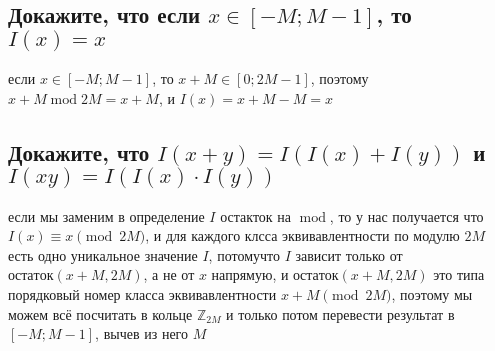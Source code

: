 \documentclass{article}
\newcommand{\Mod}[1]{\pmod{#1}}
\begin{document}
  \subsection{Докажите, что если $x \in [-M; M-1]$, то $I(x) = x$}
  если $x \in [-M; M-1]$, то $x+M \in [0; 2M-1]$, поэтому $ x+M \operatorname{mod} 2M = x+M $, и $ I(x) = x+M-M = x$
  \subsection{Докажите, что $I(x+y) = I(I(x)+I(y))$ и $I(xy) = I(I(x) \cdot I(y))$}
  если мы заменим в определение $I$ остакток на $\operatorname{mod}$, то у нас получается что $I(x) \equiv x \Mod{2M}$,
  и для каждого клсса эквивавлентности по модулю $2M$ есть одно уникальное значение $I$,
  потомучто $I$ зависит только от $остаток(x+M, 2M)$, а не от $x$ напрямую,
  и $остаток(x+M, 2M)$ это типа порядковый номер класса эквивавлентности $x+M \Mod{2M}$,
  поэтому мы можем всё посчитать в кольце $\mathbb{Z}_{2M}$
  и только потом перевести результат в $[-M; M-1]$, вычев из него $M$
\end{document}
